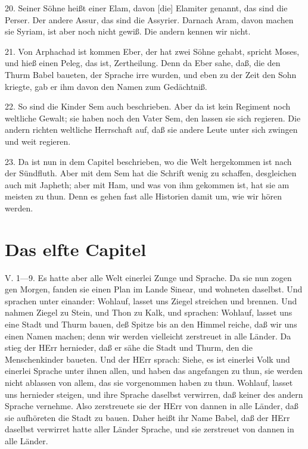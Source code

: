 20. Seiner Söhne heißt einer Elam, davon [die] Elamiter genannt, das sind die Perser. Der andere Assur, das sind die Assyrier. Darnach Aram, davon machen sie Syriam, ist aber noch nicht gewiß. Die andern kennen wir nicht.

21. Von Arphachad ist kommen Eber, der hat zwei Söhne gehabt, spricht Moses, und hieß einen Peleg, das ist, Zertheilung. Denn da Eber sahe, daß, die den Thurm Babel baueten, der Sprache irre wurden, und eben zu der Zeit den Sohn kriegte, gab er ihm davon den Namen zum Gedächtniß.

22. So sind die Kinder Sem auch beschrieben. Aber da ist kein Regiment noch weltliche Gewalt; sie haben noch den Vater Sem, den lassen sie sich regieren. Die andern richten weltliche Herrschaft auf, daß sie andere Leute unter sich zwingen und weit regieren.

23. Da ist nun in dem Capitel beschrieben, wo die Welt hergekommen ist nach der Sündfluth. Aber mit dem Sem hat die Schrift wenig zu schaffen, desgleichen auch mit Japheth; aber mit Ham, und was von ihm gekommen ist, hat sie am meisten zu thun. Denn es gehen fast alle Historien damit um, wie wir hören werden.

\section{Das elfte Capitel}

\begin{schriftzitat}
V. 1—9. Es hatte aber alle Welt einerlei Zunge und Sprache. Da sie nun zogen gen Morgen, fanden sie einen Plan im Lande Sinear, und wohneten daselbst. Und sprachen unter einander: Wohlauf, lasset uns Ziegel streichen und brennen. Und nahmen Ziegel zu Stein, und Thon zu Kalk, und sprachen: Wohlauf, lasset uns eine Stadt und Thurm bauen, deß Spitze bis an den Himmel reiche, daß wir uns einen Namen machen; denn wir werden vielleicht zerstreuet in alle Länder. Da stieg der HErr hernieder, daß er sähe die Stadt und Thurm, den die Menschenkinder baueten. Und der HErr sprach: Siehe, es ist einerlei Volk und einerlei Sprache unter ihnen allen, und haben das angefangen zu thun, sie werden nicht ablassen von allem, das sie vorgenommen haben zu thun. Wohlauf, lasset uns hernieder steigen, und ihre Sprache daselbst verwirren, daß keiner des andern Sprache vernehme. Also zerstreuete sie der HErr von dannen in alle Länder, daß sie aufhöreten die Stadt zu bauen. Daher heißt ihr Name Babel, daß der HErr daselbst verwirret hatte aller Länder Sprache, und sie zerstreuet von dannen in alle Länder.
\end{schriftzitat}

